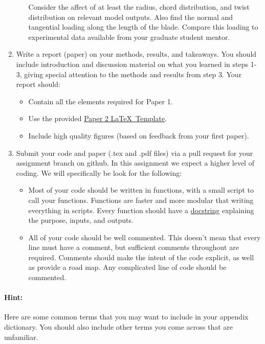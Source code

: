 \documentclass[12pt]{article}
\begin{document}
\begin{enumerate}
\begin{enumerate}
		Consider the affect of at least the radius, chord distribution, and twist distribution on relevant model outputs.
		Also find the normal and tangential loading along the length of the blade. Compare this loading to experimental data available from your graduate student mentor.   %
	\end{enumerate}
	\item Write a report (paper) on your methods, results, and takeaways. You should include introduction and discussion material on what you learned in steps 1-3, giving special attention to the methods and results from step 3. Your report should:
	\begin{itemize}
		\item Contain all the elements required for Paper 1.
		\item Use the provided \href{https://github.com/byuflowlab/undergrad-onboarding/tree/497R/497R/latex_templates/paper2_asme}{Paper 2 \LaTeX~Template}.
		\item Include high quality figures (based on feedback from your first paper).
	\end{itemize}
	\item Submit your code and paper (.tex and .pdf files) via a pull request for your assignment branch on github. In this assignment we expect a higher level of coding. We will specifically be look for the following: 
	\begin{itemize}
		\item Most of your code should be written in functions, with a small script to call your functions. Functions are faster and more modular that writing everything in scripts.  Every function should have a \href{https://docs.julialang.org/en/v1/manual/documentation/#Writing-Documentation}{docstring} explaining the purpose, inputs, and outputs. 
		\item All of your code should be well commented. This doesn't mean that every line must have a comment, but sufficient comments throughout are required. Comments should make the intent of the code explicit, as well as provide a road map. Any complicated line of code should be commented. 
	\end{itemize}
\end{enumerate}

\bigskip

\paragraph{Hint:} Here are some common terms that you may want to include in your appendix dictionary. You should also include other terms you come across that are unfamiliar.
\end{document}
